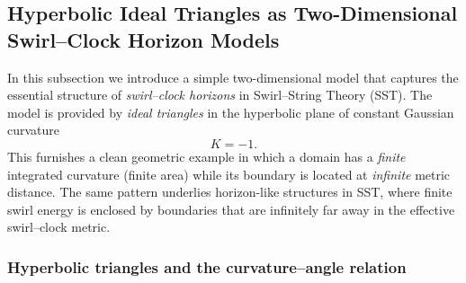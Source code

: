 \documentclass[10pt,reprint,aps,onecolumn,nofootinbib]{revtex4-2}
\begin{document}
    \subsection{Hyperbolic Ideal Triangles as Two-Dimensional Swirl–Clock Horizon Models}
    \label{subsec:hyperbolic-ideal-triangle-sst}

    In this subsection we introduce a simple two-dimensional model that captures the essential structure of \emph{swirl–clock horizons} in Swirl–String Theory (SST). The model is provided by \emph{ideal triangles} in the hyperbolic plane of constant Gaussian curvature
    \begin{equation}
        K = -1.
    \end{equation}
    This furnishes a clean geometric example in which a domain has a \emph{finite} integrated curvature (finite area) while its boundary is located at \emph{infinite} metric distance. The same pattern underlies horizon-like structures in SST, where finite swirl energy is enclosed by boundaries that are infinitely far away in the effective swirl–clock metric.

    \subsubsection{Hyperbolic triangles and the curvature--angle relation}
\end{document}

